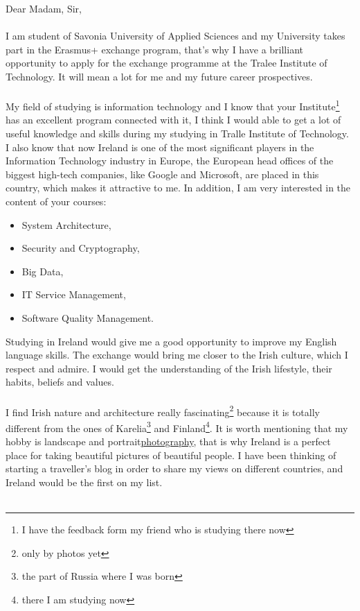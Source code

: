 \documentclass[english]{article}
\begin{document}
\newpage
\setcounter{page}{1}
\setcounter{tocdepth}{2}
Dear Madam, Sir,\\\\
I am student of Savonia University of Applied Sciences and my University takes part in the Erasmus+ exchange program, that's why I have a brilliant opportunity to apply for the exchange programme at the Tralee Institute of Technology. It will mean a lot for me and my future career prospectives.\\\\
My field of studying is information technology and I know that your Institute\footnote{I have the feedback form my friend who is studying there now} has an excellent program connected with it, I think I would able to get a lot of useful knowledge and skills during my studying in Tralle Institute of Technology. I also know that now Ireland is one of the most significant players in the Information Technology industry in Europe, the European head offices of the biggest high-tech companies, like Google and Microsoft, are placed in this country, which makes it attractive to me. In addition, I am very interested in the content of your courses:
\begin{itemize}
\item System Architecture,
\item Security and Cryptography,
\item Big Data,
\item IT Service Management, 
\item Software Quality Management.
\end{itemize}
Studying in Ireland would give me a good opportunity to improve my English language skills. The exchange would bring me closer to the Irish culture, which I respect and admire. I would get the understanding of the Irish lifestyle, their habits, beliefs and values. \\\\
I find Irish nature and architecture really fascinating\footnote{only by photos yet} because it is totally different from the ones of Karelia\footnote{the part of Russia where I was born} and Finland\footnote{there I am studying now}. It is worth mentioning that my hobby is landscape and portrait\href{https://www.facebook.com/airtucha/media_set?set=a.1404921599747323.1073741829.100006884891507&type=3}{photography}, that is why Ireland is a perfect place for taking beautiful pictures of beautiful people. I have been thinking of starting a traveller's blog in order to share my views on different countries, and Ireland would be the first on my list.\\\\
\end{document}
